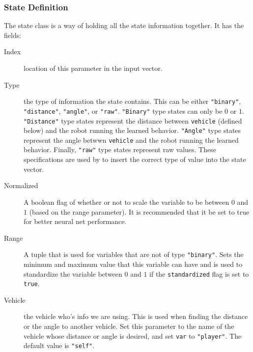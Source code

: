 \documentclass[onecolumn,letterpaper,11pt]{article}
\begin{document}
\subsubsection{State Definition}
The state class is a way of holding all the state information together. It has the fields:
\begin{description}
	\item[Index] location of this parameter in the input vector.
	
	\item[Type] the type of information the state contains. This can be either 
	\texttt{"binary"}, \texttt{"distance"}, \texttt{"angle"}, or \texttt{"raw"}. \texttt{"Binary"} type states can only be $0$ or $1$. \texttt{"Distance"} type states represent the distance between \texttt{vehicle} (defined below) and the robot running the learned behavior. \texttt{"Angle"} type states represent the angle betwwn \texttt{vehicle} and the robot running the learned behavior. Finally, \texttt{"raw"} type states represent raw values. These specifications are used by  to insert the correct type of value into the state vector. 
	
	\item[Normalized]  A boolean flag of whether or not to scale the variable to be between $0$ and $1$ (based on the range parameter). It is recommended that it be set to true for better neural net performance.
	
	\item[Range] A tuple that is used for variables that are not of type \texttt{"binary"}. Sets the minimum and maximum value that this variable can have and is used to standardize the variable between $0$ and $1$ if the \texttt{standardized} flag is set to \texttt{true}. 
	
	\item[Vehicle] the vehicle who's info we are using. This is used when finding the distance or the angle to another vehicle. Set this parameter to the name of the vehicle whose distance or angle is desired, and set \texttt{var} to \texttt{"player"}. The default value is \texttt{"self"}.
	

\end{description}
\end{document}
